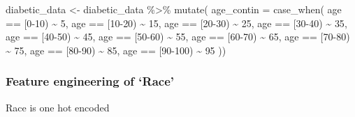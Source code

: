 \documentclass[
]{article}
\newenvironment{Shaded}{\begin{snugshade}}{\end{snugshade}}
\newcommand{\AttributeTok}[1]{\textcolor[rgb]{0.77,0.63,0.00}{#1}}
\newcommand{\DecValTok}[1]{\textcolor[rgb]{0.00,0.00,0.81}{#1}}
\newcommand{\FunctionTok}[1]{\textcolor[rgb]{0.00,0.00,0.00}{#1}}
\newcommand{\NormalTok}[1]{#1}
\newcommand{\OtherTok}[1]{\textcolor[rgb]{0.56,0.35,0.01}{#1}}
\newcommand{\SpecialCharTok}[1]{\textcolor[rgb]{0.00,0.00,0.00}{#1}}
\newcommand{\StringTok}[1]{\textcolor[rgb]{0.31,0.60,0.02}{#1}}
\begin{document}
\begin{Shaded}
\begin{Highlighting}[]
\NormalTok{diabetic\_data }\OtherTok{\textless{}{-}}\NormalTok{ diabetic\_data }\SpecialCharTok{\%\textgreater{}\%}
  \FunctionTok{mutate}\NormalTok{(}
    \AttributeTok{age\_contin =} \FunctionTok{case\_when}\NormalTok{(}
\NormalTok{      age }\SpecialCharTok{==} \StringTok{\textquotesingle{}[0{-}10)\textquotesingle{}}    \SpecialCharTok{\textasciitilde{}} \DecValTok{5}\NormalTok{,}
\NormalTok{      age }\SpecialCharTok{==} \StringTok{\textquotesingle{}[10{-}20)\textquotesingle{}}   \SpecialCharTok{\textasciitilde{}} \DecValTok{15}\NormalTok{,}
\NormalTok{      age }\SpecialCharTok{==} \StringTok{\textquotesingle{}[20{-}30)\textquotesingle{}}   \SpecialCharTok{\textasciitilde{}} \DecValTok{25}\NormalTok{,}
\NormalTok{      age }\SpecialCharTok{==} \StringTok{\textquotesingle{}[30{-}40)\textquotesingle{}}   \SpecialCharTok{\textasciitilde{}} \DecValTok{35}\NormalTok{,}
\NormalTok{      age }\SpecialCharTok{==} \StringTok{\textquotesingle{}[40{-}50)\textquotesingle{}}   \SpecialCharTok{\textasciitilde{}} \DecValTok{45}\NormalTok{,}
\NormalTok{      age }\SpecialCharTok{==} \StringTok{\textquotesingle{}[50{-}60)\textquotesingle{}}   \SpecialCharTok{\textasciitilde{}} \DecValTok{55}\NormalTok{,}
\NormalTok{      age }\SpecialCharTok{==} \StringTok{\textquotesingle{}[60{-}70)\textquotesingle{}}   \SpecialCharTok{\textasciitilde{}} \DecValTok{65}\NormalTok{,}
\NormalTok{      age }\SpecialCharTok{==} \StringTok{\textquotesingle{}[70{-}80)\textquotesingle{}}   \SpecialCharTok{\textasciitilde{}} \DecValTok{75}\NormalTok{,}
\NormalTok{      age }\SpecialCharTok{==} \StringTok{\textquotesingle{}[80{-}90)\textquotesingle{}}   \SpecialCharTok{\textasciitilde{}} \DecValTok{85}\NormalTok{,}
\NormalTok{      age }\SpecialCharTok{==} \StringTok{\textquotesingle{}[90{-}100)\textquotesingle{}}  \SpecialCharTok{\textasciitilde{}} \DecValTok{95}
\NormalTok{    ))}
\end{Highlighting}
\end{Shaded}

\hypertarget{feature-engineering-of-race}{%
\subsubsection{Feature engineering of
`Race'}\label{feature-engineering-of-race}}

Race is one hot encoded
\end{document}
